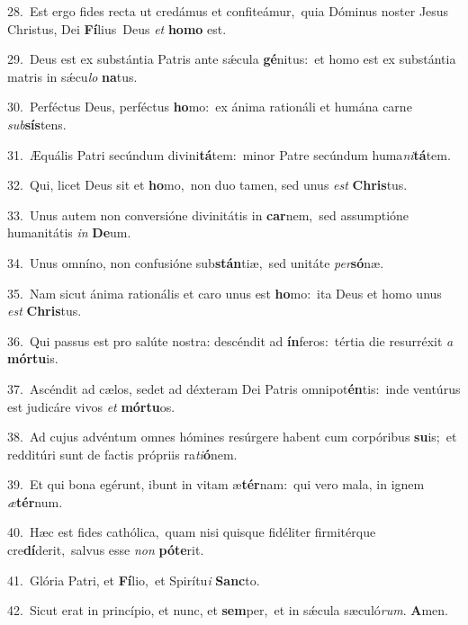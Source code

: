 {\numbfont\textcolor{\numbcolor}{28.}}~Est ergo fides recta ut credámus et confiteámur,~\dagger quia Dóminus noster Jesus Christus, Dei \textbf{Fí}\-lius~\star Deus \textit{et} \textbf{ho}\-\textbf{mo} est.\par
{\numbfont\textcolor{\numbcolor}{29.}}~Deus est ex substántia Patris ante sǽcula \textbf{gé}\-nitus:~\star et homo est ex substántia matris in sǽcu\textit{lo} \textbf{na}\-tus.\par
{\numbfont\textcolor{\numbcolor}{30.}}~Perféctus Deus, perféctus \textbf{ho}\-mo:~\star ex ánima rationáli et humána carne \textit{sub}\-\textbf{sís}tens.\par
{\numbfont\textcolor{\numbcolor}{31.}}~Æquális Patri secúndum divini\-\textbf{tá}\-tem:~\star minor Patre secúndum huma\-\textit{ni}\-\textbf{tá}tem.\par
{\numbfont\textcolor{\numbcolor}{32.}}~Qui, licet Deus sit et \textbf{ho}\-mo,~\star non duo tamen, sed unus \textit{est} \textbf{Chris}\-tus.\par
{\numbfont\textcolor{\numbcolor}{33.}}~Unus autem non conversióne divinitátis in \textbf{car}\-nem,~\star sed assumptióne humanitátis \textit{in} \textbf{De}\-um.\par
{\numbfont\textcolor{\numbcolor}{34.}}~Unus omníno, non confusióne sub\-\textbf{stán}\-tiæ,~\star sed unitáte \textit{per}\-\textbf{só}næ.\par
{\numbfont\textcolor{\numbcolor}{35.}}~Nam sicut ánima rationális et caro unus est \textbf{ho}\-mo:~\star ita Deus et homo unus \textit{est} \textbf{Chris}\-tus.\par
{\numbfont\textcolor{\numbcolor}{36.}}~Qui passus est pro salúte nostra: descéndit ad \textbf{ín}\-feros:~\star tértia die resurréxit \textit{a} \textbf{mór}\-\textbf{tu}is.\par
{\numbfont\textcolor{\numbcolor}{37.}}~Ascéndit ad cælos, sedet ad déxteram Dei Patris omnipot\-\textbf{én}\-tis:~\star inde ventúrus est judicáre vivos \textit{et} \textbf{mór}\-\textbf{tu}os.\par
{\numbfont\textcolor{\numbcolor}{38.}}~Ad cujus advéntum omnes hómines resúrgere habent cum corpóribus \textbf{su}\-is;~\star et redditúri sunt de factis própriis ra\-\textit{ti}\-\textbf{ó}nem.\par
{\numbfont\textcolor{\numbcolor}{39.}}~Et qui bona egérunt, ibunt in vitam æ\-\textbf{tér}\-nam:~\star qui vero mala, in ignem \textit{æ}\-\textbf{tér}num.\par
{\numbfont\textcolor{\numbcolor}{40.}}~Hæc est fides cathólica,~\dagger quam nisi quisque fidéliter firmitérque cre\-\textbf{dí}\-derit,~\star salvus esse \textit{non} \textbf{pót}\-\textbf{e}rit.\par
{\numbfont\textcolor{\numbcolor}{41.}}~Glória Patri, et \textbf{Fí}\-lio,~\star et Spirítu\textit{i} \textbf{Sanc}\-to.\par
{\numbfont\textcolor{\numbcolor}{42.}}~Sicut erat in princípio, et nunc, et \textbf{sem}\-per,~\star et in sǽcula sæculó\-\textit{rum}\-. \textbf{A}\-men.\par
